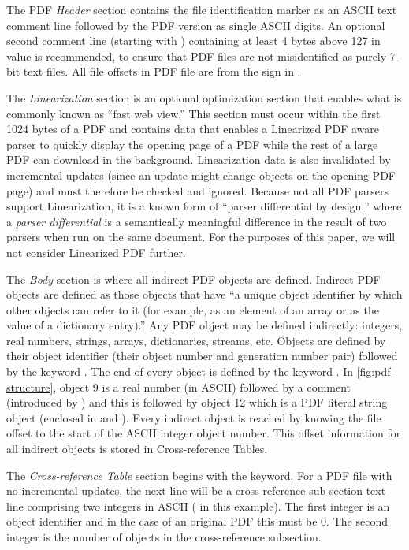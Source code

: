 The PDF \emph{Header} section contains the file identification marker as an ASCII
text comment line  followed by the PDF version as single ASCII digits. 
An optional second comment line (starting with \lstcd{\%})
containing at least 4 bytes above 127 in value is recommended, to ensure 
that PDF files are not misidentified as purely 7-bit text files. 
All file offsets in PDF file are from the \lstcd{\%} sign in .  

The \emph{Linearization} section is an optional optimization section
that enables what is commonly known as ``fast web view.''
%
This section must occur within the first 1024 bytes of a PDF and
contains data that enables a Linearized PDF aware parser to quickly
display the opening page of a PDF while the rest of a large PDF can
download in the background.
%
Linearization data is also invalidated by incremental updates (since
an update might change objects on the opening PDF page) and must
therefore be checked and ignored.
%
Because not all PDF parsers support Linearization, it is a known form
of ``parser differential by design,'' where a \emph{parser
  differential} is a semantically meaningful difference in the result
of two parsers when run on the same document.
%
For the purposes of this paper, we will not consider Linearized PDF further.

The \emph{Body} section is where all indirect PDF objects are defined. Indirect PDF objects
are defined as those objects that have ``a unique object identifier by which other objects can
refer to it (for example, as an element of an array or as the value of a dictionary entry).''
Any PDF object may be defined indirectly: integers, real numbers, strings, arrays, dictionaries, 
streams, etc. Objects are defined by their object identifier (their object number and generation 
number pair) followed by the keyword . 
The end of every object is defined by the keyword .
In \cref{fig:pdf-structure}, object 9 is a real number (in ASCII) followed by a comment
(introduced by \lstcd{\%}) and this is followed by object 12 which is a PDF literal string object
(enclosed in \lstcd{(} and \lstcd{)}).  
Every indirect object is reached by knowing the file offset to the start of the ASCII integer 
object number. This offset information for all indirect objects is stored in Cross-reference Tables.

The \emph{Cross-reference Table} section begins with the  keyword. For a PDF file
with no incremental updates, the next line will be a cross-reference sub-section text line comprising
two integers in ASCII ( in this example). The first integer is an object identifier 
and in the case of an original PDF this must be 0. The second integer is the number of
objects in the cross-reference subsection.

